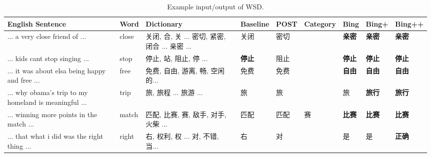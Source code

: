 \begin{CJK}{UTF8}{gbsn}
\begin{table*}[t]
  \caption{Example input/output of WSD.}
  \label{table:wsd_1}
  \begin{center}
  \begin{tabular}{| p{3cm} | p{1cm} | p{3.5cm} | p{1.2cm} | p{1cm} | p{1.3cm}| p{0.8cm} | p{0.9cm} | p{1cm} |}
    \hline
    English Sentence & Word & Dictionary & Baseline & POST & Category & Bing & Bing+ & Bing++ \\
    \hline
    ... a very close friend of ... & close & \parbox[t]{3cm}{关闭, 合, 关 ... 密切, 紧密, 闭合 ... 亲密 ...} & 关闭 & 密切 & & {\bf 亲密} & {\bf 亲密} & {\bf 亲密} \\
    \hline
    ... kids cant stop singing ... & stop & \parbox[t]{3cm}{停止, 站, 阻止, 停 ...} & {\bf 停止} & 阻止 &  & {\bf 停止} & {\bf 停止} & {\bf 停止} \\
    \hline
    ... it was about elsa being happy and free ... & free & \parbox[t]{3cm}{免费, 自由, 游离, 畅, 空闲的...} & 免费 & 免费 &  & {\bf 自由} & {\bf 自由} & {\bf 自由} \\
    \hline
    ... why obama's trip to my homeland is meaningful ... & trip & \parbox[t]{3cm}{旅, 旅程 ... 旅游 ...} & 旅 & 旅 &  & 旅 & {\bf 旅行} & {\bf 旅行} \\
    \hline
    ... winning more points in the match ... & match & \parbox[t]{3cm}{匹配, 比赛, 赛, 敌手, 对手, 火柴 ...} & 匹配 & 匹配 & 赛 & {\bf 比赛} & {\bf 比赛} & {\bf 比赛} \\
    \hline
    ... that what i did was the right thing ... & right & \parbox[t]{3cm}{右, 权利, 权 ... 对, 不错, 当...} & 右 & 对 &  & 是 & 是 & {\bf 正确} \\
    \hline
    \end{tabular}
  \end{center}
\end{table*}




\end{CJK}
